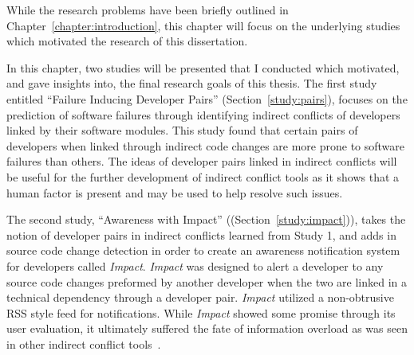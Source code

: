 \label{chapter:motivating}

\newlength{\savedunitlength}
\setlength{\unitlength}{2em}

While the research problems have been briefly outlined in Chapter~\ref{chapter:introduction}, this chapter
will focus on the underlying studies which motivated the research of this dissertation.

In this chapter, two studies will be presented that I conducted which motivated, and gave insights into, 
the final research goals
of this thesis. The first study entitled ``Failure Inducing Developer Pairs''
(Section~\ref{study:pairs}), focuses on the prediction of
software failures through identifying indirect conflicts of developers linked by their software modules. 
This study found that certain pairs of developers when linked through indirect code changes are more prone
to software failures than others. The ideas of developer pairs linked in indirect conflicts will be
useful for the further development of indirect conflict tools as it shows that a human factor is present
and may be used to help resolve such issues.

The second study, ``Awareness with Impact'' ((Section~\ref{study:impact})), 
takes the notion of developer
pairs in indirect conflicts learned from Study 1, and adds in source code change detection in order to create
an awareness notification system for developers called \textit{Impact}. \textit{Impact} was designed to alert a developer
to any source code changes preformed by another developer when the two are linked in a technical dependency through
a developer pair. \textit{Impact} utilized a non-obtrusive RSS style feed for notifications. 
While \textit{Impact} showed some promise through its user evaluation, it ultimately suffered the fate of information
overload as was seen in other indirect conflict tools~\cite{Sarma:2007:TSA,Servant:2010:CPI,Trainer:2005:BGT}.




\setlength{\unitlength}{\savedunitlength}
